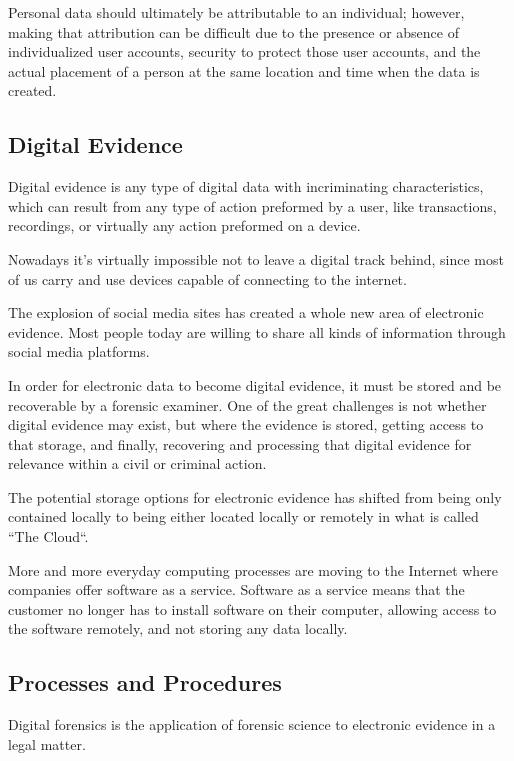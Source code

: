 Personal data should ultimately be attributable to an individual; however, making
that attribution can be difficult due to the presence or absence of individualized
user accounts, security to protect those user accounts, and the actual placement of a
person at the same location and time when the data is created.

\subsection{Digital Evidence}

Digital evidence is any type of digital data with incriminating characteristics,
which can result from any type of action preformed by a user, like transactions,
recordings, or virtually any action preformed on a device.

Nowadays it's virtually impossible not to leave a digital track behind, since most
of us carry and use devices capable of connecting to the internet.

The explosion of social media sites has created a whole new area of electronic
evidence. Most people today are willing to share all kinds of information through
social media platforms.

In order for electronic data to become digital evidence, it must be stored and be recoverable
by a forensic examiner. One of the great challenges is not whether digital
evidence may exist, but where the evidence is stored, getting access to that storage,
and finally, recovering and processing that digital evidence for relevance within
a civil or criminal action.

The potential storage options for electronic evidence has shifted from being only contained locally
to being either located locally or remotely in what is called ``The Cloud``. 

More and more everyday computing processes are moving to the Internet
where companies offer software as a service. Software as a service means that
the customer no longer has to install software on their computer, allowing access to the software remotely,
and not storing any data locally.


\subsection{Processes and Procedures}

Digital forensics is the application of forensic science to electronic evidence in a
legal matter.

